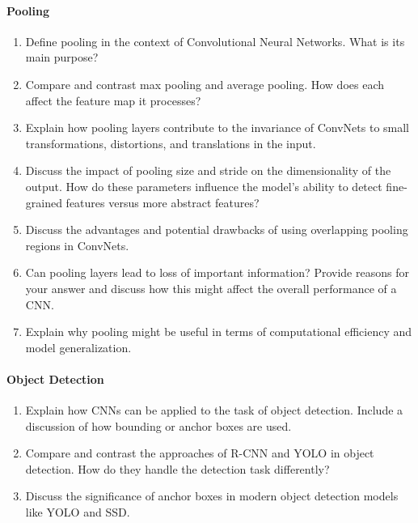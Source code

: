 \paragraph*{Pooling}
\begin{enumerate}
    \item Define pooling in the context of Convolutional Neural Networks. What is its main purpose?
    \item Compare and contrast max pooling and average pooling. How does each affect the feature map it processes?
    \item Explain how pooling layers contribute to the invariance of ConvNets to small transformations, distortions, and translations in the input.
    \item Discuss the impact of pooling size and stride on the dimensionality of the output. How do these parameters influence the model's ability to detect fine-grained features versus more abstract features?
    \item Discuss the advantages and potential drawbacks of using overlapping pooling regions in ConvNets.
    \item Can pooling layers lead to loss of important information? Provide reasons for your answer and discuss how this might affect the overall performance of a CNN.
    \item Explain why pooling might be useful in terms of computational efficiency and model generalization.
\end{enumerate}
\paragraph*{Object Detection}
\begin{enumerate}
    \item Explain how CNNs can be applied to the task of object detection. Include a discussion of how bounding or anchor boxes are used.
    \item Compare and contrast the approaches of R-CNN and YOLO in object detection. How do they handle the detection task differently?
    \item Discuss the significance of anchor boxes in modern object detection models like YOLO and SSD.
\end{enumerate}
